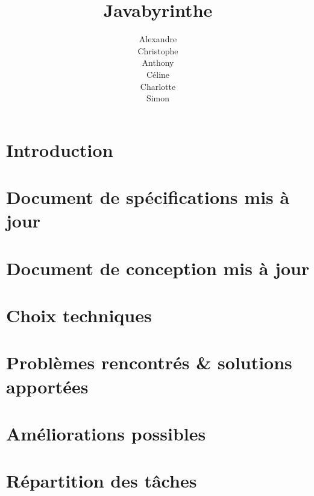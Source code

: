 \documentclass{scrreprt}
\title{Javabyrinthe}
\author{Alexandre \bsc{Brehmer}\\ Christophe \bsc{Cluizel} \\ Anthony \bsc{Courtin} \\ Céline \bsc{Leduc} \\ Charlotte \bsc{Touchard} \\ Simon \bsc{Wallon}}
\begin{document}

\tableofcontents

\chapter*{Introduction}
	

\chapter{Document de spécifications mis à jour}
	

\chapter{Document de conception mis à jour}
	

\chapter{Choix techniques}
	

\chapter{Problèmes rencontrés \& solutions apportées}
  

\chapter{Améliorations possibles}
	

\chapter{Répartition des tâches}
	
\end{document}
